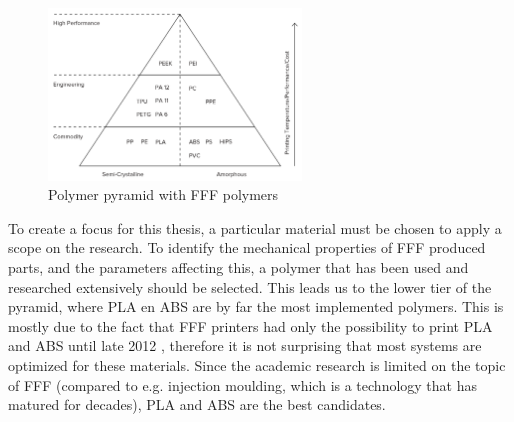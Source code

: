 \begin{figure}[H]
    \centering
    \includegraphics[width=0.6\textwidth]{chapter_2/figures/Pyramidpolymer.png}
    \caption{Polymer pyramid with FFF polymers \cite{3DHubsIntroductionPrinting}}
    \label{fig:pyramidpolymer}
\end{figure}

To create a focus for this thesis, a particular material must be chosen to apply a scope on the research. To identify the mechanical properties of FFF produced parts, and the parameters affecting this, a polymer that has been used and researched extensively should be selected. This leads us to the lower tier of the pyramid, where PLA en ABS are by far the most implemented polymers. This is mostly due to the fact that FFF printers had only the possibility to print PLA and ABS until late 2012 \cite{WohlersAssociates2017WohlersIndustry}, therefore it is not surprising that most systems are optimized for these materials. Since the academic research is limited on the topic of FFF (compared to e.g. injection moulding, which is a technology that has matured for decades), PLA and ABS are the best candidates.


